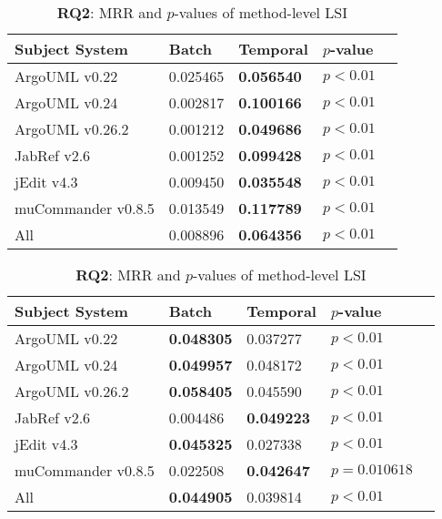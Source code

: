 \begin{table}[t]
\renewcommand{\arraystretch}{1.3}
\footnotesize
\centering
\caption{{\bf RQ2}: MRR and $p$-values of class-level LSI}
\begin{tabular}{l|ll|ll}
\toprule
Subject System & Batch & Temporal & $p$-value  \\
\midrule
ArgoUML v0.22 & 0.025465 & {\bf 0.056540 } & $p < 0.01$ \\
ArgoUML v0.24 & 0.002817 & {\bf 0.100166 } & $p < 0.01$ \\
ArgoUML v0.26.2 & 0.001212 & {\bf 0.049686 } & $p < 0.01$ \\
JabRef v2.6 & 0.001252 & {\bf 0.099428 } & $p < 0.01$ \\
jEdit v4.3 & 0.009450 & {\bf 0.035548 } & $p < 0.01$ \\
muCommander v0.8.5 & 0.013549 & {\bf 0.117789 } & $p < 0.01$ \\
\midrule
All & 0.008896 & {\bf 0.064356 } & $p < 0.01$ \\
\bottomrule
\end{tabular}
\label{table:rq2:class:lsi}
\caption{{\bf RQ2}: MRR and $p$-values of method-level LSI}
\begin{tabular}{l|ll|ll}
\toprule
Subject System & Batch & Temporal & $p$-value  \\
\midrule
ArgoUML v0.22 & {\bf 0.048305 } & 0.037277 & $p < 0.01$ \\
ArgoUML v0.24 & {\bf 0.049957 } & 0.048172 & $p < 0.01$ \\
ArgoUML v0.26.2 & {\bf 0.058405 } & 0.045590 & $p < 0.01$ \\
JabRef v2.6 & 0.004486 & {\bf 0.049223 } & $p < 0.01$ \\
jEdit v4.3 & {\bf 0.045325 } & 0.027338 & $p < 0.01$ \\
muCommander v0.8.5 & 0.022508 & {\bf 0.042647 } & $p = 0.010618$ \\
\midrule
All & {\bf 0.044905 } & 0.039814 & $p < 0.01$ \\
\bottomrule
\end{tabular}
\label{table:rq2:method:lsi}
\end{table}
